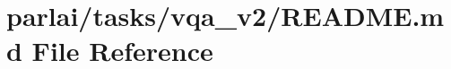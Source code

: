 \hypertarget{parlai_2tasks_2vqa__v2_2README_8md}{}\section{parlai/tasks/vqa\+\_\+v2/\+R\+E\+A\+D\+ME.md File Reference}
\label{parlai_2tasks_2vqa__v2_2README_8md}

